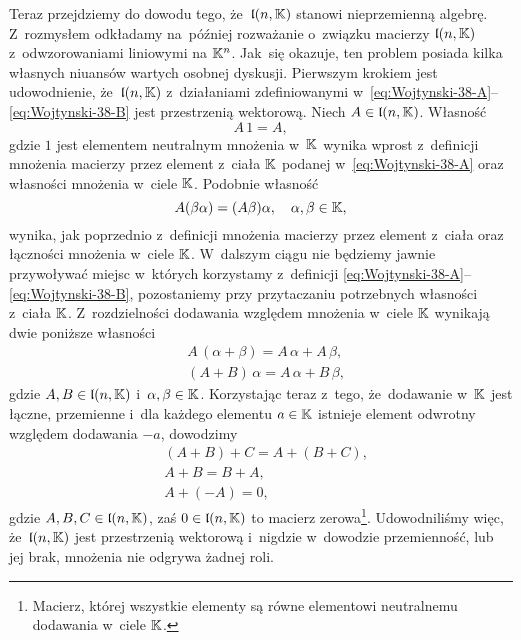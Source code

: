 \documentclass[a4paper,11pt]{article}
\begin{document}
Teraz przejdziemy do dowodu tego, że~$\mathfrak{l}( n, \mathbb{K} )$ stanowi
nieprzemienną algebrę. Z~rozmysłem odkładamy na~później rozważanie
o~związku macierzy $\mathfrak{l}( n, \mathbb{K} )$ z~odwzorowaniami liniowymi na
$\mathbb{K}^{ n }$. Jak~się okazuje, ten problem posiada kilka własnych niuansów
wartych osobnej dyskusji. Pierwszym krokiem jest udowodnienie,
że~$\mathfrak{l}( n, \mathbb{K} )$ z~działaniami zdefiniowanymi
w~\eqref{eq:Wojtynski-38-A}--\eqref{eq:Wojtynski-38-B} jest przestrzenią
wektorową. Niech $A \in \mathfrak{l}( n, \mathbb{K} )$. Własność
\begin{equation}
  \label{eq:Wojtynski-41}
  A \, 1 = A,
\end{equation}
gdzie $1$ jest elementem neutralnym mnożenia w~$\mathbb{K}$ wynika wprost
z~definicji mnożenia macierzy przez element z~ciała $\mathbb{K}$ podanej
w~\eqref{eq:Wojtynski-38-A} oraz własności mnożenia w~ciele $\mathbb{K}$.
Podobnie własność
\begin{equation}
  \label{eq:Wojtynski-42}
  A ( \beta \alpha ) = ( A \beta ) \alpha, \quad \alpha, \beta \in \mathbb{K},
\end{equation}
wynika, jak poprzednio z~definicji mnożenia macierzy przez element z~ciała
oraz łączności mnożenia w~ciele $\mathbb{K}$. W~dalszym ciągu nie będziemy jawnie
przywoływać miejsc w~których korzystamy z~definicji
\eqref{eq:Wojtynski-38-A}--\eqref{eq:Wojtynski-38-B}, pozostaniemy przy
przytaczaniu potrzebnych własności z~ciała $\mathbb{K}$. Z~rozdzielności dodawania
względem mnożenia w~ciele $\mathbb{K}$ wynikają dwie poniższe własności
\begin{subequations}
  \begin{align}
    \label{eq:Wojtynski-43-A}
    &A \, ( \alpha + \beta ) = A \, \alpha + A \, \beta, \\
    \label{eq:Wojtynski-43-B}
    &( A + B ) \, \alpha = A \, \alpha + B \, \beta,
  \end{align}
\end{subequations}
gdzie $A, B \in \mathfrak{l}( n, \mathbb{K} )$ i~$\alpha, \beta \in \mathbb{K}$. Korzystając teraz
z~tego, że~dodawanie w~$\mathbb{K}$ jest łączne, przemienne i~dla każdego
elementu $a \in \mathbb{K}$ istnieje element odwrotny względem dodawania $-a$,
dowodzimy
\begin{subequations}
  \begin{align}
    \label{eq:Wojtynski-44-A}
    &( A + B ) + C = A + ( B + C ), \\
    \label{eq:Wojtynski-44-B}
    &A + B = B + A, \\
    \label{eq:Wojtynski-44-C}
    &A + ( -A ) = 0,
  \end{align}
\end{subequations}
gdzie $A, B, C \in \mathfrak{l}( n, \mathbb{K} )$, zaś $0 \in \mathfrak{l}( n, \mathbb{K} )$ to
macierz zerowa\footnote{Macierz, której wszystkie elementy są równe
  elementowi neutralnemu dodawania w~ciele $\mathbb{K}$.}. Udowodniliśmy więc,
że~$\mathfrak{l}( n, \mathbb{K} )$ jest przestrzenią wektorową i~nigdzie w~dowodzie
przemienność, lub jej brak, mnożenia nie odgrywa żadnej roli.
\end{document}

